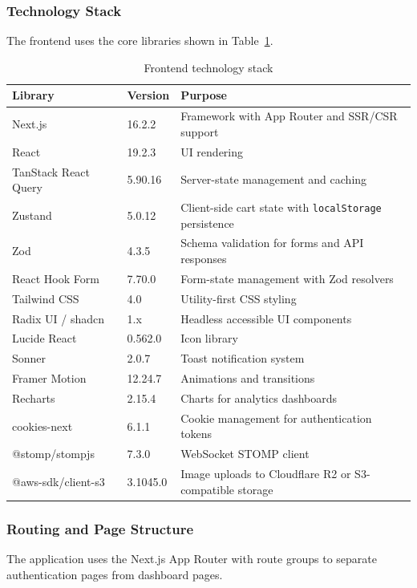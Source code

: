 \subsubsection{Technology Stack}
The frontend uses the core libraries shown in Table~\ref{tab:frontend-tech-stack}.

\begin{table}[H]
\centering
\begin{tabular}{|p{4cm}|p{2.5cm}|p{7cm}|}
\hline
\textbf{Library} & \textbf{Version} & \textbf{Purpose}\\ \hline
Next.js & 16.2.2 & Framework with App Router and SSR/CSR support\\ \hline
React & 19.2.3 & UI rendering\\ \hline
TanStack React Query & 5.90.16 & Server-state management and caching\\ \hline
Zustand & 5.0.12 & Client-side cart state with \texttt{localStorage} persistence\\ \hline
Zod & 4.3.5 & Schema validation for forms and API responses\\ \hline
React Hook Form & 7.70.0 & Form-state management with Zod resolvers\\ \hline
Tailwind CSS & 4.0 & Utility-first CSS styling\\ \hline
Radix UI / shadcn & 1.x & Headless accessible UI components\\ \hline
Lucide React & 0.562.0 & Icon library\\ \hline
Sonner & 2.0.7 & Toast notification system\\ \hline
Framer Motion & 12.24.7 & Animations and transitions\\ \hline
Recharts & 2.15.4 & Charts for analytics dashboards\\ \hline
cookies-next & 6.1.1 & Cookie management for authentication tokens\\ \hline
@stomp/stompjs & 7.3.0 & WebSocket STOMP client\\ \hline
@aws-sdk/client-s3 & 3.1045.0 & Image uploads to Cloudflare R2 or S3-compatible storage\\ \hline
\end{tabular}
\caption{Frontend technology stack}
\label{tab:frontend-tech-stack}
\end{table}

\subsubsection{Routing and Page Structure}
The application uses the Next.js App Router with route groups to separate authentication pages from dashboard pages.

